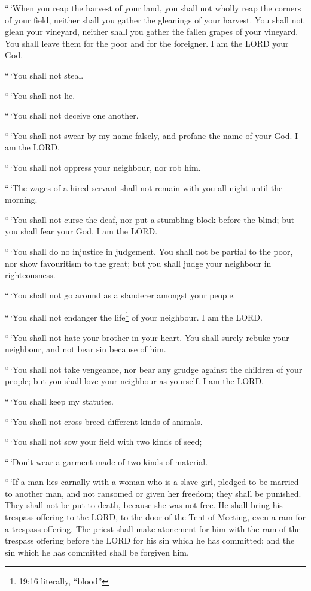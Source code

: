  ``\,`When you reap the harvest of your land, you shall not
wholly reap the corners of your field, neither shall you gather the
gleanings of your harvest.  You shall not glean your
vineyard, neither shall you gather the fallen grapes of your vineyard.
You shall leave them for the poor and for the foreigner. I am the LORD
your God.

 ``\,`You shall not steal.

``\,`You shall not lie.

``\,`You shall not deceive one another.

 ``\,`You shall not swear by my name falsely, and profane
the name of your God. I am the LORD.

 ``\,`You shall not oppress your neighbour, nor rob him.

``\,`The wages of a hired servant shall not remain with you all night
until the morning.

 ``\,`You shall not curse the deaf, nor put a stumbling
block before the blind; but you shall fear your God. I am the LORD.

 ``\,`You shall do no injustice in judgement. You shall not
be partial to the poor, nor show favouritism to the great; but you shall
judge your neighbour in righteousness.

 ``\,`You shall not go around as a slanderer amongst your
people.

``\,`You shall not endanger the life\footnote{19:16 literally, ``blood''}
of your neighbour. I am the LORD.

 ``\,`You shall not hate your brother in your heart. You
shall surely rebuke your neighbour, and not bear sin because of him.

 ``\,`You shall not take vengeance, nor bear any grudge
against the children of your people; but you shall love your neighbour
as yourself. I am the LORD.

 ``\,`You shall keep my statutes.

``\,`You shall not cross-breed different kinds of animals.

``\,`You shall not sow your field with two kinds of seed;

``\,`Don't wear a garment made of two kinds of material.

 ``\,`If a man lies carnally with a woman who is a slave
girl, pledged to be married to another man, and not ransomed or given
her freedom; they shall be punished. They shall not be put to death,
because she was not free.  He shall bring his trespass
offering to the LORD, to the door of the Tent of Meeting, even a ram for
a trespass offering.  The priest shall make atonement for
him with the ram of the trespass offering before the LORD for his sin
which he has committed; and the sin which he has committed shall be
forgiven him.

